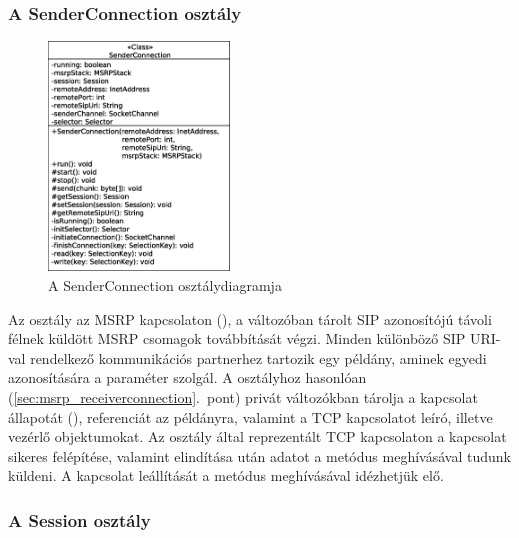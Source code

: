 \subsubsection*{A SenderConnection osztály}
\label{sec:msrp_senderconnection}

\begin{figure}
  \vspace{-15pt}
  \begin{center}
    \includegraphics[width=0.43\textwidth]{img/class_diagrams/SenderConnection.eps}
  \end{center}
  \vspace{-15pt}
  \captionsetup{font=scriptsize}
  \caption{A SenderConnection osztálydiagramja}
   \label{fig:class_senderconnection}
  \vspace{-10pt}
\end{figure}
Az osztály az MSRP kapcsolaton (), a  változóban tárolt SIP azonosítójú távoli félnek küldött MSRP csomagok továbbítását végzi. Minden különböző SIP URI-val rendelkező kommunikációs partnerhez tartozik egy  példány, aminek egyedi azonosítására a  paraméter szolgál. A  osztályhoz hasonlóan (\ref{sec:msrp_receiverconnection}.~pont) privát változókban tárolja a kapcsolat állapotát (), referenciát az  példányra, valamint a TCP kapcsolatot leíró, illetve vezérlő objektumokat. Az osztály által reprezentált TCP kapcsolaton a kapcsolat sikeres felépítése, valamint elindítása után adatot a  metódus meghívásával tudunk küldeni. A kapcsolat leállítását a  metódus meghívásával idézhetjük elő.

\newpage
\subsubsection*{A Session osztály}
\label{sec:msrp_session}

